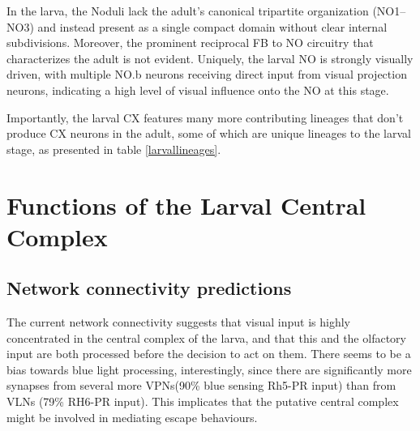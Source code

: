 
In the larva, the Noduli lack the adult’s canonical tripartite organization (NO1–NO3) and instead present as a single compact domain without clear internal subdivisions. Moreover, the prominent reciprocal FB to NO circuitry that characterizes the adult is not evident. Uniquely, the larval NO is strongly visually driven, with multiple NO.b neurons receiving direct input from visual projection neurons, indicating a high level of visual influence onto the NO at this stage. 


Importantly, the larval CX features many more contributing lineages that don't produce CX neurons in the adult, some of which are unique lineages to the larval stage, as presented in table \ref{larvallineages}.



\section{Functions of the Larval Central Complex}

        \subsection{Network connectivity predictions}

        The current network connectivity suggests that visual input is highly concentrated in the central complex of the larva, and that this and the olfactory input are both processed before the decision to act on them. There seems to be a bias towards blue light processing, interestingly, since there are significantly more synapses from several more VPNs(90\% blue sensing Rh5-PR input) than from VLNs (79\% RH6-PR input). This implicates that the putative central complex might be involved in mediating escape behaviours. 

